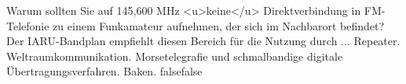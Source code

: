     {Warum sollten Sie auf 145,600 MHz <u>keine</u> Direktverbindung in FM-Telefonie zu einem Funkamateur aufnehmen, der sich im Nachbarort befindet? Der IARU-Bandplan empfiehlt diesen Bereich für die Nutzung durch ...}
    {Repeater.}
    {Weltraumkommunikation.}
    {Morsetelegrafie und schmalbandige digitale Übertragungsverfahren.}
    {Baken.}
    {false}{false}